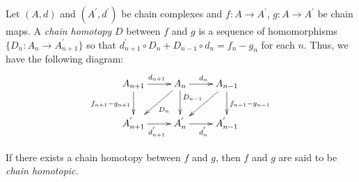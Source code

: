 \documentclass{article}
\begin{document}
Let $(A,d)$ and $(A^{'},d^{'})$ be chain complexes and $f:A \to A^{'}$, $g:A \to A^{'}$ be chain maps. A \emph{chain homotopy} $D$ between $f$ and $g$ is a sequence of homomorphisms $\{D_{n}:A_{n} \to A_{n+1}^{'}\}$ so that $d_{n+1}^{'} \circ D_{n} + D_{n-1} \circ d_{n}=f_{n}-g_{n}$ for each $n$. Thus, we have the following diagram: 
$$
\xymatrix{
& A_{n+1} \ar[r]^{d_{n+1}} \ar[d]_{f_{n+1}-g_{n+1}} & A_{n} \ar[dl]^{D_{n}} \ar[r]^{d_{n}} \ar[d]  & A_{n-1} \ar[dl]_{D_{n-1}} \ar[d]^{f_{n-1}-g_{n-1}} \\
& A_{n+1}^{'} \ar[r]_{d_{n+1}^{'}} & A_{n}^{'} \ar[r]_{d_{n}^{'}} & A_{n-1}^{'}
}
$$

If there exists a chain homotopy between $f$ and $g$, then $f$ and $g$ are said to be \emph{chain homotopic.}
\end{document}

